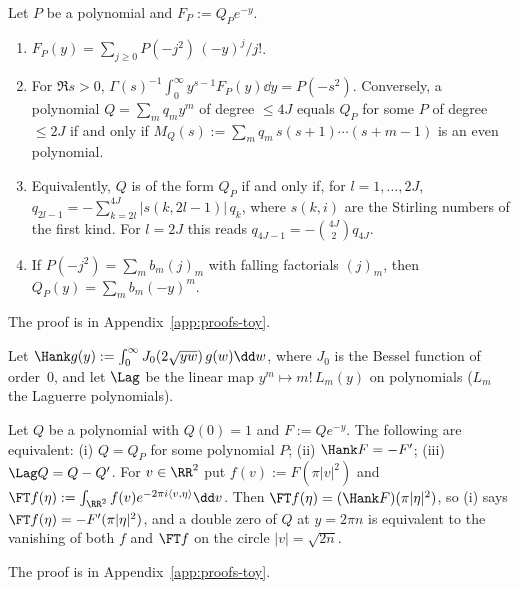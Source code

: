 \begin{proposition}\label{prop:umbral}
Let $P$ be a polynomial and $F_P:=Q_Pe^{-y}$.
\begin{enumerate}[label=\textup{(\alph*)}]
\item $F_P(y)=\sum_{j\ge0}P(-j^2)\,(-y)^j/j!$.
\item For $\Re s>0$, $\Gamma(s)^{-1}\int_0^\infty y^{s-1}F_P(y)\dd y=P(-s^2)$. Conversely, a polynomial
$Q=\sum_mq_my^m$ of degree $\le 4J$ equals $Q_P$ for some $P$ of degree $\le 2J$ if and only if
$M_Q(s):=\sum_mq_m\,s(s+1)\cdots(s+m-1)$ is an even polynomial.
\item Equivalently, $Q$ is of the form $Q_P$ if and only if, for $l=1,\dots,2J$,
$q_{2l-1}=-\sum_{k=2l}^{4J}|s(k,2l-1)|\,q_k$, where $s(k,i)$ are the Stirling numbers of the first kind. For
$l=2J$ this reads $q_{4J-1}=-\binom{4J}{2}q_{4J}$.
\item If $P(-j^2)=\sum_mb_m(j)_m$ with falling factorials $(j)_m$, then $Q_P(y)=\sum_mb_m(-y)^m$.
\end{enumerate}
\end{proposition}

The proof is in Appendix~\ref{app:proofs-toy}.

Let $\Hank g(y):=\int_0^\infty J_0(2\sqrt{yw})\,g(w)\dd w$, where $J_0$ is the Bessel function of order~$0$, and
let $\Lag$ be the linear map $y^m\mapsto m!\,L_m(y)$ on polynomials ($L_m$ the Laguerre polynomials).

\begin{proposition}\label{prop:radial}
Let $Q$ be a polynomial with $Q(0)=1$ and $F:=Qe^{-y}$. The following are equivalent:
\textup{(i)} $Q=Q_P$ for some polynomial $P$; \textup{(ii)} $\Hank F=-F'$; \textup{(iii)} $\Lag Q=Q-Q'$.
For $v\in\RR^2$ put $f(v):=F(\pi|v|^2)$ and $\FT f(\eta):=\int_{\RR^2}f(v)e^{-2\pi i\langle v,\eta\rangle}\dd v$. Then
$\FT f(\eta)=(\Hank F)(\pi|\eta|^2)$, so \textup{(i)} says $\FT f(\eta)=-F'(\pi|\eta|^2)$, and a double zero of $Q$ at
$y=2\pi n$ is equivalent to the vanishing of both $f$ and $\FT f$ on the circle $|v|=\sqrt{2n}$.
\end{proposition}

The proof is in Appendix~\ref{app:proofs-toy}.

